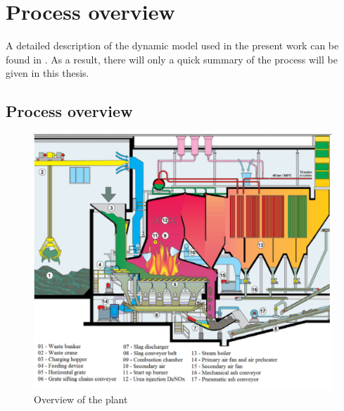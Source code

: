 \chapter{Process overview}
 \label{cha:process_overview}
A detailed description of the dynamic model used in the present work can be found in \cite{Elisa_source}.
As a result, there will only a quick summary of the process will be given in this thesis. 

\section{Process overview}

\begin{figure}[htbp]
    \centering
    \includegraphics[width=\textwidth]{img/plant_overview.png}
    \caption{Overview of the plant}
    \label{fig:plant_overview}
  \end{figure}
  

